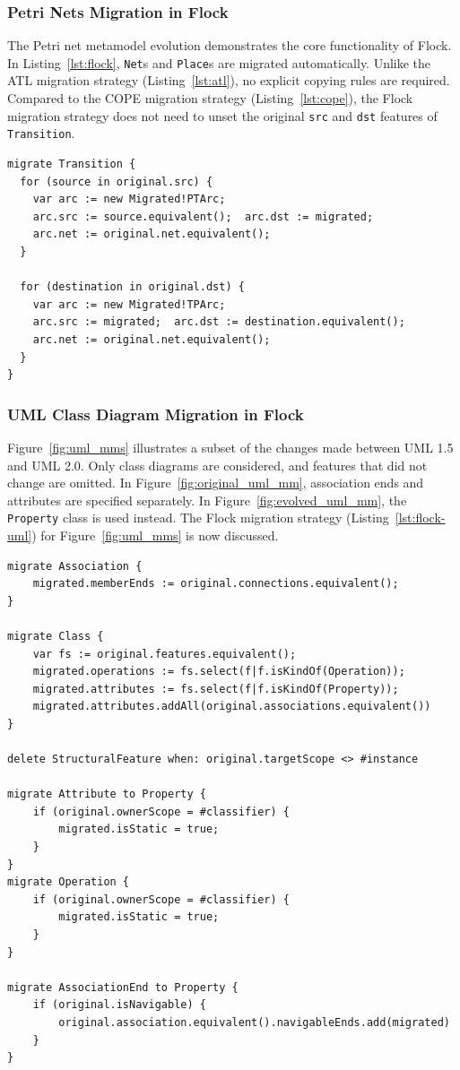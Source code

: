 \subsubsection{Petri Nets Migration in Flock}
The Petri net metamodel evolution demonstrates the core functionality of Flock. In Listing~\ref{lst:flock}, \texttt{Net}s and \texttt{Place}s are migrated automatically. Unlike the ATL migration strategy (Listing~\ref{lst:atl}), no explicit copying rules are required. Compared to the COPE migration strategy (Listing~\ref{lst:cope}), the Flock migration strategy does not need to unset the original \texttt{src} and \texttt{dst} features of \texttt{Transition}.

\begin{lstlisting}[caption=Petri nets model migration in Flock, label=lst:flock, language=Flock]
migrate Transition {
  for (source in original.src) {
    var arc := new Migrated!PTArc;
    arc.src := source.equivalent();  arc.dst := migrated;
    arc.net := original.net.equivalent();
  }

  for (destination in original.dst) {
    var arc := new Migrated!TPArc;
    arc.src := migrated;  arc.dst := destination.equivalent();
    arc.net := original.net.equivalent();
  }
}
\end{lstlisting}

\subsubsection{UML Class Diagram Migration in Flock}
Figure~\ref{fig:uml_mms} illustrates a subset of the changes made between UML 1.5 and UML 2.0. Only class diagrams are considered, and features that did not change are omitted. In Figure~\ref{fig:original_uml_mm}, association ends and attributes are specified separately. In Figure~\ref{fig:evolved_uml_mm}, the \texttt{Pr\-op\-er\-ty} class is used instead. The Flock migration strategy (Listing~\ref{lst:flock-uml}) for Figure~\ref{fig:uml_mms} is now discussed.

\begin{lstlisting}[caption=UML model migration in Flock, label=lst:flock-uml, language=Flock]
migrate Association {
	migrated.memberEnds := original.connections.equivalent();
}

migrate Class {
	var fs := original.features.equivalent();
	migrated.operations := fs.select(f|f.isKindOf(Operation));
	migrated.attributes := fs.select(f|f.isKindOf(Property));
	migrated.attributes.addAll(original.associations.equivalent())
}

delete StructuralFeature when: original.targetScope <> #instance

migrate Attribute to Property {
	if (original.ownerScope = #classifier) {
		migrated.isStatic = true;		
	}
}
migrate Operation {
	if (original.ownerScope = #classifier) {
		migrated.isStatic = true;
	}
}

migrate AssociationEnd to Property {
	if (original.isNavigable) {
		original.association.equivalent().navigableEnds.add(migrated)
	}
}
\end{lstlisting}

